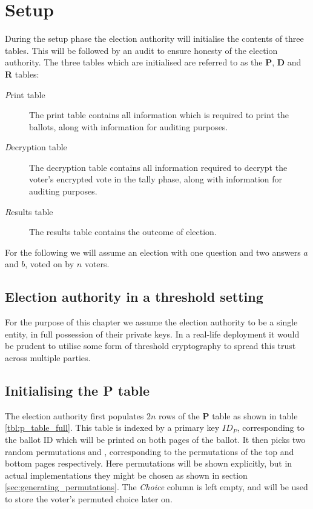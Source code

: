 \chapter{Setup}
\label{ch:setup}

During the setup phase the election authority will initialise the contents of
three tables. This will be followed by an audit to ensure honesty of the
election authority. The three tables which are initialised are referred to as
the \textbf{P}, \textbf{D} and \textbf{R} tables:
\begin{description}
\item[\emph{P}rint table] The print table contains all information which is
	required to print the ballots, along with information for auditing
		purposes.
\item[\emph{D}ecryption table] The decryption table contains all information
	required to decrypt the voter's encrypted vote in the tally phase,
		along with information for auditing purposes.
\item[\emph{R}esults table] The results table contains the outcome of election.
\end{description}

For the following we will assume an election with one question and two answers
$a$ and $b$, voted on by $n$ voters.

\section{Election authority in a threshold setting}

For the purpose of this chapter we assume the election authority to be a single
entity, in full possession of their private keys. In a real-life deployment it
would be prudent to utilise some form of threshold cryptography to spread this
trust across multiple parties.

\section{Initialising the \textbf{P} table}

The election authority first populates $2n$ rows of the \textbf{P} table as
shown in table \ref{tbl:p_table_full}. This table is indexed by a primary key
$ID_P$, corresponding to the ballot ID which will be printed on both pages of
the ballot. It then picks two random permutations \ptop{} and \pbottom{},
corresponding to the permutations of the top and bottom pages respectively.
Here permutations will be shown explicitly, but in actual implementations they
might be chosen as shown in section \ref{sec:generating_permutations}. The
\emph{Choice} column is left empty, and will be used to store the voter's
permuted choice later on.

